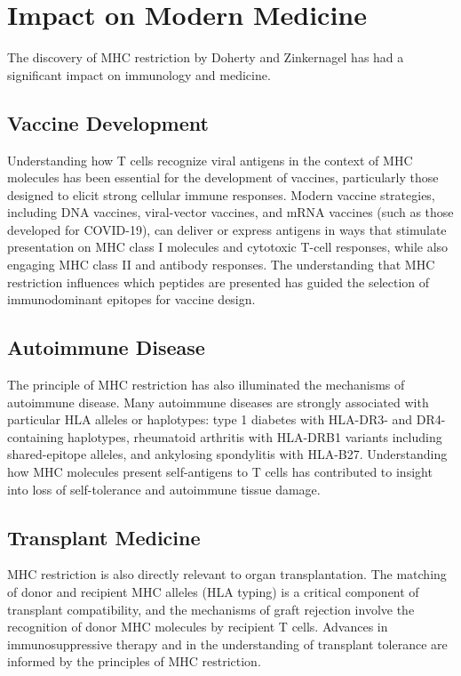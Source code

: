 \section{Impact on Modern Medicine}

The discovery of MHC restriction by Doherty and Zinkernagel has had a significant impact on immunology and medicine.

\subsection{Vaccine Development}

Understanding how T cells recognize viral antigens in the context of MHC molecules has been essential for the development of vaccines, particularly those designed to elicit strong cellular immune responses. Modern vaccine strategies, including DNA vaccines, viral-vector vaccines, and mRNA vaccines (such as those developed for COVID-19), can deliver or express antigens in ways that stimulate presentation on MHC class I molecules and cytotoxic T-cell responses, while also engaging MHC class II and antibody responses. The understanding that MHC restriction influences which peptides are presented has guided the selection of immunodominant epitopes for vaccine design.

\subsection{Autoimmune Disease}

The principle of MHC restriction has also illuminated the mechanisms of autoimmune disease. Many autoimmune diseases are strongly associated with particular HLA alleles or haplotypes: type 1 diabetes with HLA-DR3- and DR4-containing haplotypes, rheumatoid arthritis with HLA-DRB1 variants including shared-epitope alleles, and ankylosing spondylitis with HLA-B27. Understanding how MHC molecules present self-antigens to T cells has contributed to insight into loss of self-tolerance and autoimmune tissue damage.

\subsection{Transplant Medicine}

MHC restriction is also directly relevant to organ transplantation. The matching of donor and recipient MHC alleles (HLA typing) is a critical component of transplant compatibility, and the mechanisms of graft rejection involve the recognition of donor MHC molecules by recipient T cells. Advances in immunosuppressive therapy and in the understanding of transplant tolerance are informed by the principles of MHC restriction.

